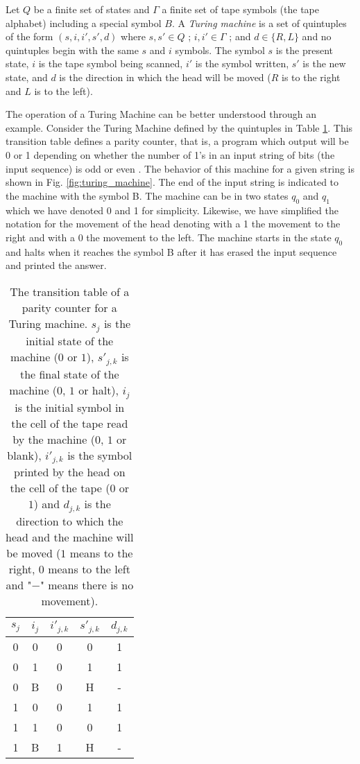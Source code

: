 \begin{defn}
Let $Q$ be a finite set of states and $\Gamma$ a finite set of tape symbols (the tape alphabet) including a special symbol $B$. A \textit{Turing machine} is a set of quintuples of the form $(s,i,i',s',d)$ where $ s,s'  \in Q $ ; $ i,i' \in \Gamma $ ; and $ d \in \{ R,L \} $ and no quintuples begin with the same $s$ and $i$ symbols. The symbol $s$ is the present state, $i$ is the tape symbol being scanned, $i'$ is the symbol written, $s'$ is the new state, and $d$ is the direction in which the head will be moved ($R$ is to the right and $L$ is to the left).\\
\end{defn}

The operation of a Turing Machine can be better understood through an example. Consider the Turing Machine defined by the quintuples in Table \ref{transition}. This transition table defines a parity counter, that is, a program which output will be 0 or 1 depending on whether the number of 1's in an input string of bits (the input sequence) is odd or even \cite{marvin}. The behavior of this machine for a given string is shown in Fig. \ref{fig:turing_machine}. The end of the input string is indicated to the machine with the symbol B. The machine can be in two states $q_{0}$ and $q_{1}$ which we have denoted 0 and 1 for simplicity. Likewise, we have simplified the notation for the movement of the head denoting with a 1 the movement to the right and with a 0 the movement to the left. The machine starts in the state $q_{0}$ and halts when it reaches the symbol B after it has erased the input sequence and printed the answer.

\begin{table}[h]
\centering
\begin{tabular}{ |c |c |c |c |c| }
 \hline  
 $s_{j}$ & $i_{j}$ & $i'_{j,k}$ & $s'_{j,k}$ & $d_{j,k}$ \\
 \hline \hline  
 0 & 0& 0& 0& 1 \\ 
 \hline  
 0 & 1& 0& 1& 1 \\ 
 \hline 
 0 & B& 0& H& -  \\ 
 \hline 
 1 & 0& 0& 1& 1  \\ 
 \hline 
 1 & 1& 0& 0& 1 \\
 \hline
 1 & B& 1& H& - \\
 \hline
\end{tabular}
 \caption{The transition table of a parity counter for a Turing machine. $s_{j}$ is the initial state of the machine ($0$ or $1$), $s'_{j,k}$ is the final state of the machine ($0$, $1$ or halt), $i_{j}$ is the initial symbol in the cell of the tape read by the machine ($0$, $1$ or blank), $i'_{j,k}$ is the symbol printed by the head on the cell of the tape ($0$ or $1$) and $d_{j,k}$ is the direction to which the head and the machine will be moved ($1$ means to the right, $0$ means to the left and "$-$" means there is no movement).}
 \label{transition}
\end{table}


